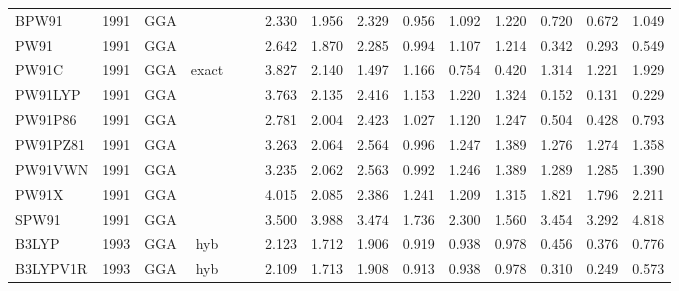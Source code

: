 \begin{landscape}
\begin{longtable}{lc:cccc:rrr:rrr:rrr}
    BPW91            & 1991 & GGA  &          &             &           & 2.330             & 1.956             & 2.329  & 0.956              & 1.092             & 1.220  & 0.720   & 0.672 & 1.049 \\
    PW91             & 1991 & GGA  &          &             &           & 2.642             & 1.870             & 2.285  & 0.994              & 1.107             & 1.214  & 0.342   & 0.293 & 0.549 \\
    PW91C            & 1991 & GGA  & exact    &             &           & 3.827             & 2.140             & 1.497  & 1.166              & 0.754             & 0.420  & 1.314   & 1.221 & 1.929 \\
    PW91LYP          & 1991 & GGA  &          &             &           & 3.763             & 2.135             & 2.416  & 1.153              & 1.220             & 1.324  & 0.152   & 0.131 & 0.229 \\
    PW91P86          & 1991 & GGA  &          &             &           & 2.781             & 2.004             & 2.423  & 1.027              & 1.120             & 1.247  & 0.504   & 0.428 & 0.793 \\
    PW91PZ81         & 1991 & GGA  &          &             &           & 3.263             & 2.064             & 2.564  & 0.996              & 1.247             & 1.389  & 1.276   & 1.274 & 1.358 \\
    PW91VWN          & 1991 & GGA  &          &             &           & 3.235             & 2.062             & 2.563  & 0.992              & 1.246             & 1.389  & 1.289   & 1.285 & 1.390 \\
    PW91X            & 1991 & GGA  &          &             &           & 4.015             & 2.085             & 2.386  & 1.241              & 1.209             & 1.315  & 1.821   & 1.796 & 2.211 \\
    SPW91            & 1991 & GGA  &          &             &           & 3.500             & 3.988             & 3.474  & 1.736              & 2.300             & 1.560  & 3.454   & 3.292 & 4.818 \\
    B3LYP            & 1993 & GGA  & hyb      &             &           & 2.123             & 1.712             & 1.906  & 0.919              & 0.938             & 0.978  & 0.456   & 0.376 & 0.776 \\
    B3LYPV1R         & 1993 & GGA  & hyb      &             &           & 2.109             & 1.713             & 1.908  & 0.913              & 0.938             & 0.978  & 0.310   & 0.249 & 0.573 \\

\end{longtable}
\end{landscape}
